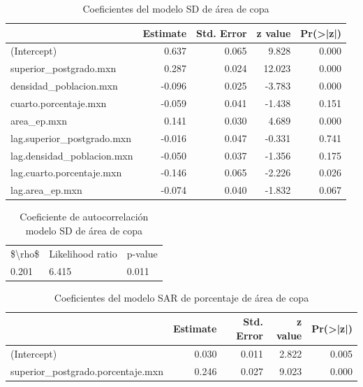 \documentclass[12pt,]{book}
\begin{document}
\begin{table}

\caption{\label{tab:coef-sd-copa}Coeficientes del modelo SD de área de copa}
\centering
\begin{tabular}[t]{lrrrr}
\toprule
  & Estimate & Std. Error & z value & Pr(>|z|)\\
\midrule
(Intercept) & 0.637 & 0.065 & 9.828 & 0.000\\
superior\_postgrado.mxn & 0.287 & 0.024 & 12.023 & 0.000\\
densidad\_poblacion.mxn & -0.096 & 0.025 & -3.783 & 0.000\\
cuarto.porcentaje.mxn & -0.059 & 0.041 & -1.438 & 0.151\\
area\_ep.mxn & 0.141 & 0.030 & 4.689 & 0.000\\
\addlinespace
lag.superior\_postgrado.mxn & -0.016 & 0.047 & -0.331 & 0.741\\
lag.densidad\_poblacion.mxn & -0.050 & 0.037 & -1.356 & 0.175\\
lag.cuarto.porcentaje.mxn & -0.146 & 0.065 & -2.226 & 0.026\\
lag.area\_ep.mxn & -0.074 & 0.040 & -1.832 & 0.067\\
\bottomrule
\end{tabular}
\end{table}\begin{table}

\caption{\label{tab:coef-rho-copa}Coeficiente de autocorrelación modelo SD de área de copa}
\centering
\begin{tabular}[t]{lll}
\toprule
\$\textbackslash{}rho\$ & Likelihood ratio & p-value\\
0.201 & 6.415 & 0.011\\
\bottomrule
\end{tabular}
\end{table}

\begin{table}

\caption{\label{tab:coef-sar-copaap}Coeficientes del modelo SAR de porcentaje de área de copa}
\centering
\begin{tabular}[t]{lrrrr}
\toprule
  & Estimate & Std. Error & z value & Pr(>|z|)\\
\midrule
(Intercept) & 0.030 & 0.011 & 2.822 & 0.005\\
superior\_postgrado.porcentaje.mxn & 0.246 & 0.027 & 9.023 & 0.000\\
\bottomrule
\end{tabular}
\end{table}
\end{document}
